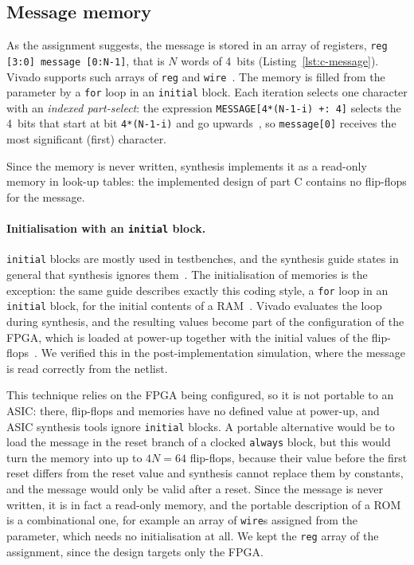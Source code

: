 \documentclass{article}
\begin{document}
\subsection{Message memory}
As the assignment suggests, the message is stored in an array of registers,
\texttt{reg [3:0] message [0:N-1]}, that is $N$ words of 4~bits
(Listing~\ref{lst:c-message}). Vivado supports such arrays of \texttt{reg}
and \texttt{wire}~\cite[Arrays of Reg and Wire]{ug901}. The memory is filled
from the parameter by a \texttt{for} loop in an \texttt{initial} block. Each
iteration selects one character with an \emph{indexed part-select}: the
expression \texttt{MESSAGE[4*(N-1-i) +: 4]} selects the 4~bits that start at bit
\texttt{4*(N-1-i)} and go upwards~\cite[Sec.~5.2.1]{ieee1364}, so
\texttt{message[0]} receives the most significant (first) character.



Since the memory is never written, synthesis implements it as a read-only memory
in look-up tables: the implemented design of part C contains no flip-flops for the
message.

\paragraph{Initialisation with an \texttt{initial} block.}
\texttt{initial} blocks are mostly used in testbenches, and the synthesis guide
states in general that synthesis ignores them~\cite[Blocks]{ug901}. The
initialisation of memories is the exception: the same guide describes exactly this
coding style, a \texttt{for} loop in an \texttt{initial} block, for the initial
contents of a RAM~\cite[Initializing RAM Contents]{ug901}. Vivado evaluates the
loop during synthesis, and the resulting values become part of the configuration of
the FPGA, which is loaded at power-up together with the initial values of the
flip-flops~\cite[When and Where to Use a Reset]{ug949}. We verified this in the
post-implementation simulation, where the message is read correctly from the netlist.

This technique relies on the FPGA being configured, so it is not portable to an
ASIC: there, flip-flops and memories have no defined value at power-up, and ASIC
synthesis tools ignore \texttt{initial} blocks. A portable alternative would be to
load the message in the reset branch of a clocked \texttt{always} block, but this
would turn the memory into up to $4N = 64$ flip-flops, because their value before
the first reset differs from the reset value and synthesis cannot replace them by
constants, and the message would only be valid after a reset. Since the message is
never written, it is in fact a read-only memory, and the portable description of a
ROM is a combinational one, for example an array of \texttt{wire}s assigned from
the parameter, which needs no initialisation at all. We kept the \texttt{reg}
array of the assignment, since the design targets only the FPGA.
\end{document}
